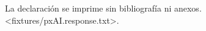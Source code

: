 \documentclass[ES,AI,no-cover,no-toc]{P3CTeX}
\begin{document}
La declaración se imprime sin bibliografía ni anexos.
  <fixtures/pxAI.response.txt>.
\end{document}
